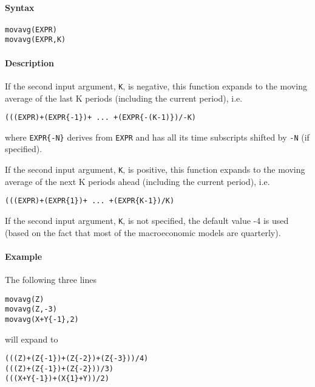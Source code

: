 


	\paragraph{Syntax}

\begin{verbatim}
movavg(EXPR)
movavg(EXPR,K)
\end{verbatim}

\paragraph{Description}

If the second input argument, \texttt{K}, is negative, this function
expands to the moving average of the last K periods (including the
current period), i.e.

\begin{verbatim}
(((EXPR)+(EXPR{-1})+ ... +(EXPR{-(K-1)})/-K)
\end{verbatim}

where \texttt{EXPR\{-N\}} derives from \texttt{EXPR} and has all its
time subscripts shifted by \texttt{-N} (if specified).

If the second input argument, \texttt{K}, is positive, this function
expands to the moving average of the next K periods ahead (including the
current period), i.e.

\begin{verbatim}
(((EXPR)+(EXPR{1})+ ... +(EXPR{K-1})/K)
\end{verbatim}

If the second input argument, \texttt{K}, is not specified, the default
value -4 is used (based on the fact that most of the macroeconomic
models are quarterly).

\paragraph{Example}

The following three lines

\begin{verbatim}
movavg(Z)
movavg(Z,-3)
movavg(X+Y{-1},2)
\end{verbatim}

will expand to

\begin{verbatim}
(((Z)+(Z{-1})+(Z{-2})+(Z{-3}))/4)
(((Z)+(Z{-1})+(Z{-2}))/3)
(((X+Y{-1})+(X{1}+Y))/2)
\end{verbatim}


